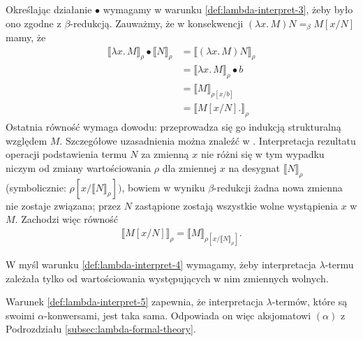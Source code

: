 Określając działanie \(\bullet\) wymagamy w warunku \ref{def:lambda-interpret-3}, żeby było ono zgodne z \(\beta\)-redukcją. Zauważmy, że w konsekwencji \((\lambda x.\,M) N =_\beta M[x/N]\) mamy, że
\begin{align*}
  \llbracket \lambda x.\,M \rrbracket_\rho \bullet \llbracket N \rrbracket_\rho 
    &= \llbracket (\lambda x.\,M) N\rrbracket_\rho \\
    &= \llbracket \lambda x.\,M \rrbracket_\rho \bullet b \\
    &= \llbracket M \rrbracket_{\rho[x/b]} \\
    &= \llbracket M[x/N]. \rrbracket_\rho\tag{\dagger}\label{eq:abstraction-to-substitution-in-model}
\end{align*}
Ostatnia równość wymaga dowodu: przeprowadza się go indukcją strukturalną względem \(M\). Szczegółowe uzasadnienia można znaleźć w \cite[Tw. 15.10(a)]{Hindley:2008:LCI:1388400}. Interpretacja rezultatu operacji podstawienia termu \(N\) za zmienną \(x\) nie różni się w tym wypadku niczym od zmiany wartościowania \(\rho\) dla zmiennej \(x\) na desygnat \(\llbracket N\rrbracket_\rho\) (symbolicznie: \(\rho[x/\llbracket N \rrbracket_\rho])\), bowiem w wyniku \(\beta\)-redukcji żadna nowa zmienna nie zostaje związana; przez \(N\) zastąpione zostają wszystkie wolne wystąpienia \(x\) w \(M\). Zachodzi więc równość
\begin{align*}
  \llbracket M[x/N] \rrbracket_\rho = \llbracket M \rrbracket_{\rho[x/\llbracket N \rrbracket_\rho]}.
\end{align*}

W myśl warunku \ref{def:lambda-interpret-4} wymagamy, żeby interpretacja \(\lambda\)-termu zależała tylko od wartościowania występujących w nim zmiennych wolnych. 

Warunek \ref{def:lambda-interpret-5} zapewnia, że interpretacja \(\lambda\)-termów, które są swoimi \(\alpha\)-konwersami, jest taka sama. Odpowiada on więc aksjomatowi \((\alpha)\) z Podrozdziału \ref{subsec:lambda-formal-theory}.

  
